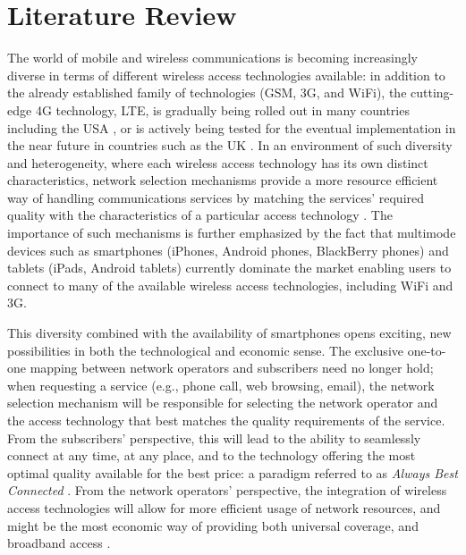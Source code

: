 \chapter{Literature Review} %
\label{cha:literature}

\minitoc
\vspace{10mm}

The world of mobile and wireless communications is becoming increasingly diverse in terms of different wireless access technologies available: in addition to the already established family of technologies (GSM, 3G, and WiFi), the cutting-edge 4G technology, LTE, is gradually being rolled out in many countries including the USA \cite{VerizonLTEUSA}, or is actively being tested for the eventual implementation in the near future in countries such as the UK \cite{BBCLTEUK}. In an environment of such diversity and heterogeneity, where each wireless access technology has its own distinct characteristics, network selection mechanisms provide a more resource efficient way of handling communications services by matching the services' required quality with the characteristics of a particular access technology \cite{HossainBeaubrun09, HossainTalebiFard09}. The importance of such mechanisms is further emphasized by the fact that multimode devices such as smartphones (iPhones, Android phones, BlackBerry phones) and tablets (iPads, Android tablets) currently dominate the market enabling users to connect to many of the available wireless access technologies, including WiFi and 3G.

This diversity combined with the availability of smartphones opens exciting, new possibilities in both the technological and economic sense. The exclusive one-to-one mapping between network operators and subscribers need no longer hold; when requesting a service (e.g., phone call, web browsing, email), the network selection mechanism will be responsible for selecting the network operator and the access technology that best matches the quality requirements of the service. From the subscribers' perspective, this will lead to the ability to seamlessly connect at any time, at any place, and to the technology offering the most optimal quality available for the best price: a paradigm referred to as \emph{Always Best Connected} \cite{ABC03}. From the network operators' perspective, the integration of wireless access technologies will allow for more efficient usage of network resources, and might be the most economic way of providing both universal coverage, and broadband access \cite{HossainBeaubrun09}.

